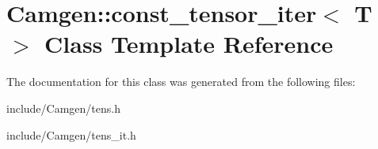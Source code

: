 \hypertarget{a00107}{\section{Camgen\-:\-:const\-\_\-tensor\-\_\-iter$<$ T $>$ Class Template Reference}
\label{a00107}
}


The documentation for this class was generated from the following files\-:\begin{DoxyCompactItemize}
\item 
include/\-Camgen/tens.\-h\item 
include/\-Camgen/tens\-\_\-it.\-h\end{DoxyCompactItemize}
